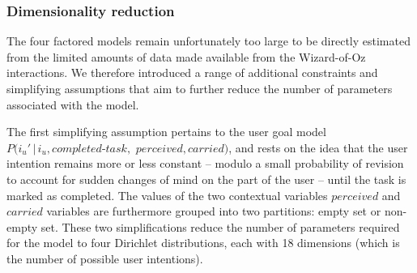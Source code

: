 \subsubsection*{Dimensionality reduction}


The four factored models remain unfortunately too large to be directly estimated from the limited amounts of data made available from the Wizard-of-Oz interactions.  We therefore introduced a range of additional constraints and simplifying assumptions that aim to further reduce the number of parameters associated with the model.


The first simplifying assumption pertains to the user goal model $P(i_u' \, | \, i_u, \mathit{completed\mbox{-}task},$ $\mathit{perceived}, \mathit{carried})$, and rests on the idea that the user intention remains more or less constant -- modulo a small probability of revision to account for sudden changes of mind on the part of the user -- until the task is marked as completed. The values of the two contextual variables $\mathit{perceived}$ and $\mathit{carried}$ variables are furthermore grouped into two partitions: empty set or non-empty set. These two simplifications reduce the number of parameters required for the model to four Dirichlet distributions, each with 18 dimensions (which is the number of possible user intentions). 


